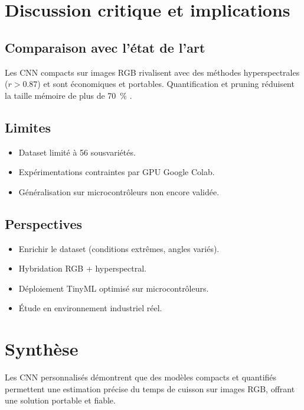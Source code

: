 \section{Discussion critique et implications}
\subsection{Comparaison avec l’état de l’art}
Les CNN compacts sur images RGB rivalisent avec des méthodes hyperspectrales ($r>0.87$) \cite{mendoza2018prediction} et sont économiques et portables. Quantification et pruning réduisent la taille mémoire de plus de 70~\% \cite{jacob2018quantization, han2016deep}.

\subsection{Limites}
\begin{itemize}
    \item Dataset limité à 56 sous\-variétés.  
    \item Expérimentations contraintes par GPU Google Colab.  
    \item Généralisation sur microcontrôleurs non encore validée.
\end{itemize}

\subsection{Perspectives}
\begin{itemize}
    \item Enrichir le dataset (conditions extrêmes, angles variés).  
    \item Hybridation RGB + hyperspectral.  
    \item Déploiement TinyML optimisé sur microcontrôleurs.  
    \item Étude en environnement industriel réel.
\end{itemize}

\section{Synthèse}
Les CNN personnalisés démontrent que des modèles compacts et quantifiés permettent une estimation précise du temps de cuisson sur images RGB, offrant une solution portable et fiable.